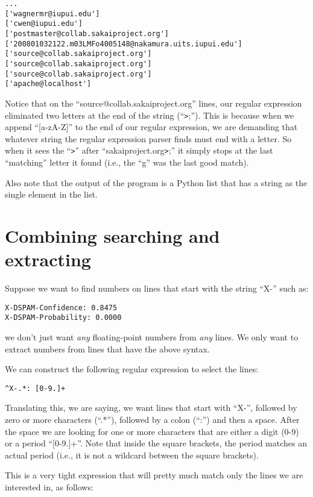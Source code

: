 \beforeverb
\begin{verbatim}
...
['wagnermr@iupui.edu']
['cwen@iupui.edu']
['postmaster@collab.sakaiproject.org']
['200801032122.m03LMFo4005148@nakamura.uits.iupui.edu']
['source@collab.sakaiproject.org']
['source@collab.sakaiproject.org']
['source@collab.sakaiproject.org']
['apache@localhost']
\end{verbatim}
\afterverb
%
Notice that on the ``source@collab.sakaiproject.org'' lines, our regular expression
eliminated two letters at the end of the string (``\verb">";'').  This is because when we
append ``[a-zA-Z]'' to the end of our regular expression, we are demanding that whatever
string the regular expression parser finds must end with a letter.   So when it sees the
``\verb">"'' after ``sakaiproject.org\verb">";'' it simply stops at the last ``matching''
letter it found (i.e., the ``g'' was the last good match).

Also note that the output of the program is a Python list that has a string as the single
element in the list.

\section{Combining searching and extracting}

Suppose we want to find numbers on lines that start with the string ``X-'' such as:

\beforeverb
\begin{verbatim}
X-DSPAM-Confidence: 0.8475
X-DSPAM-Probability: 0.0000
\end{verbatim}
\afterverb
%
we don't just want {\em any} floating-point numbers from {\em any} lines.  We only want to extract
numbers from lines that have the above syntax.

We can construct the following regular expression to select the lines:

\beforeverb
\begin{verbatim}
^X-.*: [0-9.]+
\end{verbatim}
\afterverb
%
Translating this, we are saying, we want lines that start with ``X-'', followed by zero or
more characters (``.*''), followed by a colon (``:'') and then a space.  After the space we are
looking for one or more characters that are either a digit (0-9) or a period ``[0-9.]+''.
Note that inside the square brackets, the period matches an actual period (i.e., it is not a
wildcard between the square brackets).

This is a very tight expression that will pretty much match only the lines we are interested
in, as follows:

